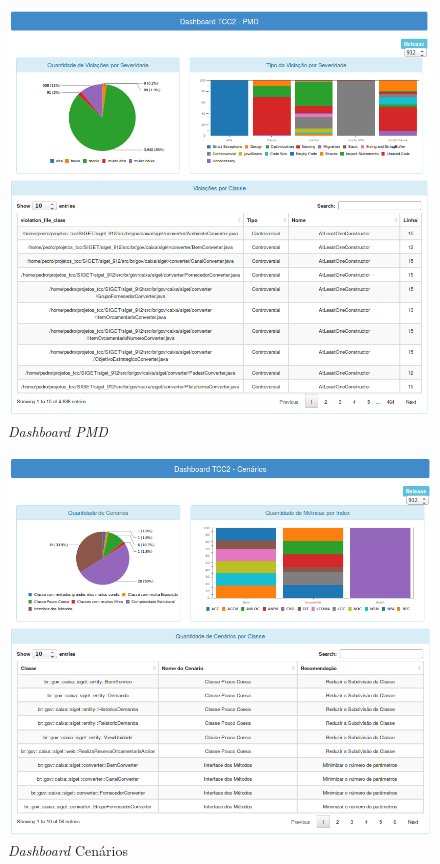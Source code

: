 \begin{figure}[H]
\centering
\includegraphics[keepaspectratio=false,scale=0.55]{figuras/figuras_nilton/DashboardPMD.png}
\caption{\textit{Dashboard PMD}}
\label{dashboardPMD}
\end{figure}

\begin{figure}[H]
\centering
\includegraphics[keepaspectratio=false,scale=0.55]{figuras/figuras_nilton/DashboardCenarios.png}
\caption{\textit{Dashboard} Cenários}
\label{dashboardFindbugs}
\end{figure}

